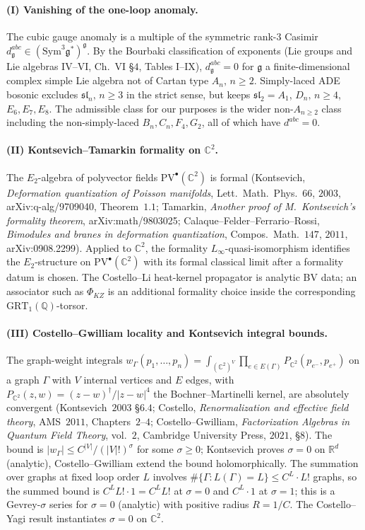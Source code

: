 \documentclass[11pt]{article}
\providecommand{\frakg}{\mathfrak{g}}
\providecommand{\C}{\mathbb{C}}
\providecommand{\R}{\mathbb{R}}
\providecommand{\Q}{\mathbb{Q}}
\providecommand{\GRT}{\mathrm{GRT}}
\providecommand{\PV}{\mathrm{PV}}
\theoremstyle{definition}\newtheorem{definition}[theorem]{Definition}
\theoremstyle{remark}\newtheorem{remark}[theorem]{Remark}\newtheorem{example}[theorem]{Example}
\begin{document}
\paragraph{(I) Vanishing of the one-loop anomaly.}
The cubic gauge anomaly is a multiple of the symmetric rank-$3$ Casimir
$d^{abc}_\frakg \in (\mathrm{Sym}^3\frakg^*)^\frakg$. By the Bourbaki
classification of exponents (Lie groups and Lie algebras IV--VI, Ch.~VI
\S$4$, Tables I--IX), $d^{abc}_\frakg = 0$ for $\frakg$ a finite-dimensional
complex simple Lie algebra not of Cartan type $A_n,\,n\ge 2$. Simply-laced
ADE bosonic excludes $\mathfrak{sl}_n,\,n\ge 3$ in the strict sense, but
keeps $\mathfrak{sl}_2 = A_1$, $D_n,\,n\ge 4$, $E_6, E_7, E_8$. The
admissible class for our purposes is the wider non-$A_{n\ge 2}$ class
including the non-simply-laced $B_n, C_n, F_4, G_2$, all of which have
$d^{abc} = 0$.

\paragraph{(II) Kontsevich--Tamarkin formality on $\C^2$.}
The $E_2$-algebra of polyvector fields $\PV^\bullet(\C^2)$ is formal
(Kontsevich, \emph{Deformation quantization of Poisson manifolds},
Lett.~Math.~Phys.~$66$, $2003$, arXiv:q-alg/9709040, Theorem~$1.1$;
Tamarkin, \emph{Another proof of M.\ Kontsevich's formality theorem},
arXiv:math/9803025; Calaque--Felder--Ferrario--Rossi, \emph{Bimodules and
branes in deformation quantization}, Compos.\ Math.~$147$, $2011$,
arXiv:0908.2299). Applied to $\C^2$, the formality $L_\infty$-quasi-isomorphism
identifies the $E_2$-structure on $\PV^\bullet(\C^2)$ with its formal
classical limit after a formality datum is chosen. The Costello--Li
heat-kernel propagator is analytic BV data; an associator such as
$\Phi_{KZ}$ is an additional formality choice inside the corresponding
$\GRT_1(\Q)$-torsor.

\paragraph{(III) Costello--Gwilliam locality and Kontsevich integral bounds.}
The graph-weight integrals
$w_\Gamma(p_1,\dots,p_n) = \int_{(\C^2)^V}\prod_{e\in E(\Gamma)} P_{\C^2}(p_{e^-},p_{e^+})$
on a graph $\Gamma$ with $V$ internal vertices and $E$ edges, with
$P_{\C^2}(z,w) = (z-w)^{\dagger}/|z-w|^4$ the Bochner--Martinelli kernel,
are absolutely convergent (Kontsevich~$2003$ \S$6.4$; Costello,
\emph{Renormalization and effective field theory}, AMS~$2011$,
Chapters~$2$--$4$; Costello--Gwilliam, \emph{Factorization Algebras in
Quantum Field Theory}, vol.~$2$, Cambridge University Press, $2021$, \S$8$). The bound is
$|w_\Gamma| \leq C^{|V|}/(|V|!)^\sigma$ for some $\sigma \geq 0$;
Kontsevich proves $\sigma = 0$ on $\R^d$ (analytic), Costello--Gwilliam
extend the bound holomorphically. The summation over graphs at fixed
loop order $L$ involves $\#\{\Gamma : L(\Gamma) = L\} \leq C^L \cdot L!$
graphs, so the summed bound is $C^L L! \cdot 1 = C^L L!$ at $\sigma = 0$
and $C^L \cdot 1$ at $\sigma = 1$; this is a Gevrey-$\sigma$ series for
$\sigma = 0$ (analytic) with positive radius $R = 1/C$. The Costello--Yagi
result instantiates $\sigma = 0$ on $\C^2$.
\end{document}
